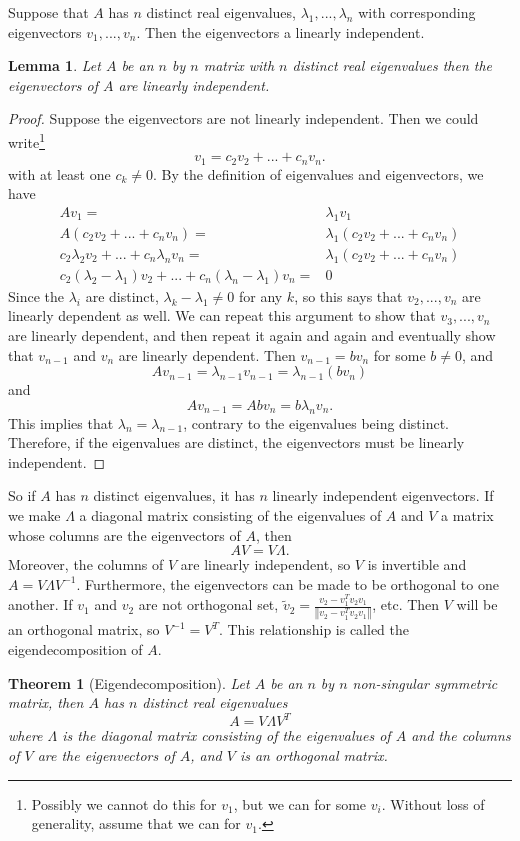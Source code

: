 \documentclass[12pt,reqno]{amsart}
\newtheorem{theorem}{Theorem}[section]
\newtheorem{lemma}{Lemma}[section]
\theoremstyle{definition}
\newcommand{\norm}[1]{\left\Vert {#1} \right\Vert}
\begin{document}
Suppose that $A$ has $n$ distinct real eigenvalues, $\lambda_1, ...,
\lambda_n$ with corresponding eigenvectors $v_1, ..., v_n$. Then the
eigenvectors a linearly independent.
\begin{lemma}
  Let $A$ be an $n$ by $n$ matrix with $n$ distinct real eigenvalues
  then the eigenvectors of $A$ are linearly independent.
\end{lemma}
\begin{proof}
  Suppose the eigenvectors are not linearly independent. Then we could
  write\footnote{Possibly we cannot do this for $v_1$, but we can for
    some $v_i$. Without loss of generality, assume that we can for
    $v_1$.}
  \[ v_1 = c_2 v_2 + ... + c_n v_n. \]
  with at least one $c_k \neq 0$.
  By the definition of eigenvalues and eigenvectors, we have
  \begin{align*} A v_1 = & \lambda_1 v_1 \\
    A(c_2 v_2 + ... + c_n v_n) = & \lambda_1 \left(c_2 v_2 + ... + c_n
      v_n\right) \\
    c_2 \lambda_2 v_2 + ... + c_n \lambda_n v_n = & \lambda_1
    \left(c_2 v_2 + ... + c_n v_n\right) \\
    c_2 (\lambda_2 - \lambda_1) v_2 + ... + c_n (\lambda_n -
    \lambda_1) v_n = & 0
  \end{align*}
  Since the $\lambda_i$ are distinct, $\lambda_k - \lambda_1 \neq 0$
  for any $k$, so this says that $v_2, ..., v_n$ are linearly
  dependent as well. We can repeat this argument to show that $v_3,
  ..., v_n$ are linearly dependent, and then repeat it again and again
  and eventually show that $v_{n-1}$ and $v_n$ are linearly
  dependent. Then $v_{n-1} = bv_n$ for some $b \neq 0$, and 
  \[ A v_{n-1} = \lambda_{n-1} v_{n-1} = \lambda_{n-1} (b v_n) \]
  and 
  \[ A v_{n-1} = A b v_n = b \lambda_n v_n. \]
  This implies that $\lambda_n = \lambda_{n-1}$, contrary to the
  eigenvalues being distinct. Therefore, if the eigenvalues are
  distinct, the eigenvectors must be linearly independent.   
\end{proof}
So if $A$ has $n$ distinct eigenvalues, it has $n$ linearly
independent eigenvectors. If we make $\Lambda$ a diagonal matrix
consisting of the eigenvalues of $A$ and $V$ a matrix whose columns are
the eigenvectors of $A$, then 
\[ A V = V \Lambda. \]
Moreover, the columns of $V$ are linearly independent, so $V$ is
invertible and $A = V \Lambda V^{-1}$. Furthermore, the eigenvectors
can be made to be orthogonal to one another. If $v_1$ and $v_2$ are
not orthogonal set, $\tilde{v}_2 = \frac{v_2 - v_1^T v_2
  v_1}{\norm{v_2 - v_1^T v_2 v_1}}$, etc. Then $V$ will be an
orthogonal matrix, so $V^{-1} = V^T$. This relationship is called the
eigendecomposition of $A$.
\begin{theorem}[Eigendecomposition]
  Let $A$ be an $n$ by $n$ non-singular symmetric matrix, then $A$ has
  $n$ distinct real eigenvalues
  \[ A = V \Lambda V^T \]
  where $\Lambda$ is the diagonal matrix consisting of the eigenvalues
  of $A$ and the columns of $V$ are the eigenvectors of $A$, and $V$
  is an orthogonal matrix.  
\end{theorem}
\end{document}

